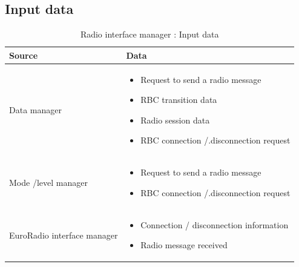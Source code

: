 \documentclass[nocc]{template/openetcs_report}
\begin{document}
\subsection{Input data}
			\begin{longtable}{|l|l|}
				\caption{Radio interface manager : Input data}\\ 
				\hline
				
					\begin{minipage}[t]{0.35\linewidth} \textbf{Source}	\end{minipage} 
				&	\begin{minipage}[t]{0.65\linewidth} \textbf{Data} \end{minipage} \\
				
				\hline
																																									
					\begin{minipage}[t]{0.35\linewidth} Data manager	\end{minipage} 
				&	\begin{minipage}[t]{0.65\linewidth}
						\begin{itemize}
							\item Request to send a radio message
							\item RBC transition data
							\item Radio session data
							\item RBC connection /.disconnection request
						\end{itemize}
					\end{minipage} \\
				
				\hline
				
					\begin{minipage}[t]{0.35\linewidth} Mode /level manager	\end{minipage} 
				&	\begin{minipage}[t]{0.65\linewidth}
						\begin{itemize}
							\item Request to send a radio message
							\item RBC connection /.disconnection request
						\end{itemize}			
					\end{minipage} \\
				
				\hline
					
					\begin{minipage}[t]{0.35\linewidth} EuroRadio interface manager	\end{minipage} 
				&	\begin{minipage}[t]{0.65\linewidth}
						\begin{itemize}
							\item Connection / disconnection information
							\item Radio message received
						\end{itemize}			
					\end{minipage} \\
				

\end{longtable}
\end{document}
